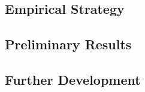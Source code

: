 \documentclass[11pt]{article}
\begin{document}
\subsection{Empirical Strategy} \label{subsec:methods_paper3}

\subsection{Preliminary Results} \label{subsec:results_paper3}

\subsection{Further Development} \label{subsec:conclusion_paper3}

\clearpage

\setlength\bibsep{0pt}


\end{document}
